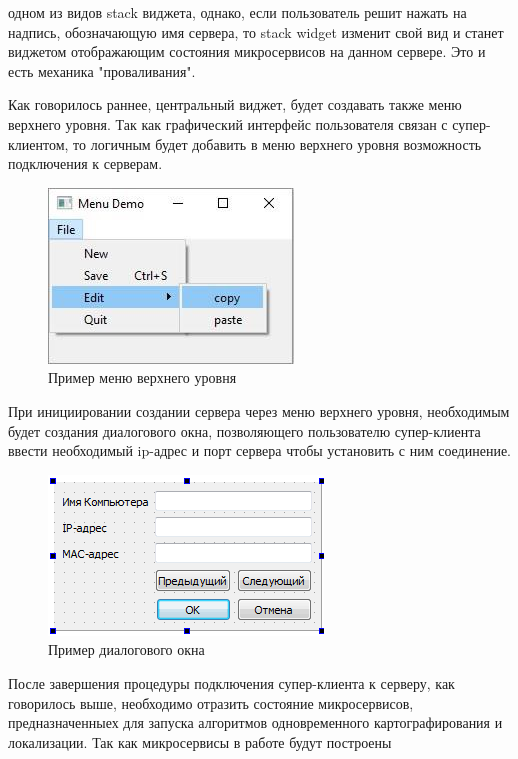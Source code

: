 \documentclass[a4paper, 14pt]{extreport}
\begin{document}
одном из видов stack виджета, однако, если пользователь решит нажать на надпись, обозначающую имя сервера, то stack widget изменит 
свой вид и станет виджетом отображающим состояния микросервисов на данном сервере. Это и есть механика "проваливания".
\par Как говорилось раннее, центральный виджет, будет создавать также меню верхнего уровня. Так как графический интерфейс пользователя
связан с супер-клиентом, то логичным будет добавить в меню верхнего уровня возможность подключения к серверам.
\begin{figure}[ht]
\begin{center}
\includegraphics[scale = 0.6]{./figure/menu_examp}
\caption{Пример меню верхнего уровня}
\label{fig:manip_photo}
\end{center}
\end{figure}
\par При инициировании создании сервера через меню верхнего уровня, необходимым будет создания диалогового окна, позволяющего
пользователю супер-клиента ввести необходимый ip-адрес и порт сервера чтобы установить с ним соединение.
\begin{figure}[ht]
\begin{center}
\includegraphics[scale = 0.6]{./figure/dialog_examp}
\caption{Пример диалогового окна}
\label{fig:manip_photo}
\end{center}
\end{figure}
\par После завершения процедуры подключения супер-клиента к серверу, как говорилось выше, необходимо отразить состояние микросервисов,
предназначенныех для запуска алгоритмов одновременного картографирования и локализации. Так как микросервисы в работе будут построены
\end{document}
